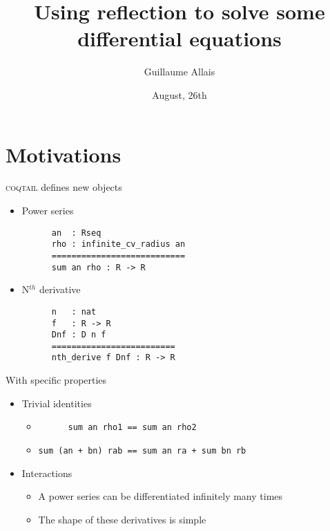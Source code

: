 \documentclass{beamer}
\author{Guillaume Allais}
\title{Using reflection to solve some differential equations}
\institute{\coqtail{} Junior Laboratory\\
	ENS Lyon}
\date{August, 26th}
\newcommand{\coqtail}{\textsc{coqtail}}
\begin{document}
\begin{frame}[t,plain]
\titlepage
\end{frame}

\begin{frame}
\tableofcontents
\end{frame}

\section{Motivations}

\begin{frame}[fragile]{\coqtail{} defines new objects}
\begin{itemize}
  \item Power series

  \begin{verbatim}
      an  : Rseq
      rho : infinite_cv_radius an
      ===========================
      sum an rho : R -> R
  \end{verbatim}

  \item N$^{th}$ derivative

  \begin{verbatim}
      n   : nat
      f   : R -> R
      Dnf : D n f
      =========================
      nth_derive f Dnf : R -> R
  \end{verbatim}
\end{itemize}
\end{frame}

\begin{frame}[fragile]{With specific properties}
\begin{itemize}
  \item Trivial identities
  \begin{itemize}
    \item \verb!      sum an rho1 == sum an rho2!
    \item \verb!sum (an + bn) rab == sum an ra + sum bn rb!
  \end{itemize}
\bigskip
  \item Interactions
  \begin{itemize}
    \item A power series can be differentiated infinitely many times
    \item The shape of these derivatives is simple
  \end{itemize}
\end{itemize}

\bigskip
{}
\end{frame}
\end{document}
